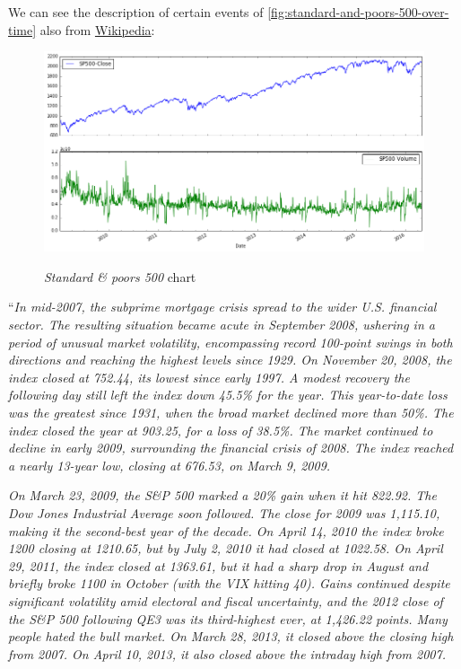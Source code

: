 We can see the description of certain events of
\autoref{fig:standard-and-poors-500-over-time} also from
\href{https://en.wikipedia.org/wiki/S\%26P_500_Index}{Wikipedia}:

\begin{figure}[bth]
  \myfloatalign
  {\includegraphics[width=1\linewidth]
    {gfx/standard-and-poors-500-over-time}}
  \caption{\textit{Standard \& poors 500}
    chart}
  \label{fig:standard-and-poors-500-over-time}
\end{figure}

``\textit{In mid-2007, the subprime mortgage crisis spread to the
wider U.S. financial sector. The resulting situation became acute in
September 2008, ushering in a period of unusual market volatility,
encompassing record 100-point swings in both directions and reaching
the highest levels since 1929. On November 20, 2008, the index closed
at 752.44, its lowest since early 1997. A modest recovery the
following day still left the index down 45.5\% for the year. This
year-to-date loss was the greatest since 1931, when the broad market
declined more than 50\%. The index closed the year at 903.25, for a
loss of 38.5\%. The market continued to decline in early 2009,
surrounding the financial crisis of 2008. The index reached a nearly
13-year low, closing at 676.53, on March 9, 2009.}

\textit{On March 23, 2009, the S\&P 500 marked a 20\% gain when it hit
822.92. The Dow Jones Industrial Average soon followed. The close for
2009 was 1,115.10, making it the second-best year of the decade. On
April 14, 2010 the index broke 1200 closing at 1210.65, but by July 2,
2010 it had closed at 1022.58. On April 29, 2011, the index closed at
1363.61, but it had a sharp drop in August and briefly broke 1100 in
October (with the VIX hitting 40). Gains continued despite significant
volatility amid electoral and fiscal uncertainty, and the 2012 close
of the S\&P 500 following QE3 was its third-highest ever, at 1,426.22
points. Many people hated the bull market. On March 28, 2013, it
closed above the closing high from 2007. On April 10, 2013, it also
closed above the intraday high from 2007.}

